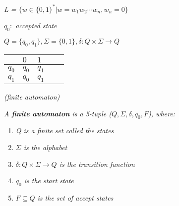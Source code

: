 \documentclass{article}
\begin{document}
\begin{example}
    \textit{L = $\{w\in \{0,1\}^*|w = w_1w_2\cdots w_n,w_n = 0\}$\\}
    \begin{remark}
        \textit{$q_0:$ accepted state}
    \end{remark}
    \textit{$Q = \{q_0,q_1\},\Sigma = \{0,1\},\delta: Q\times \Sigma \rightarrow Q$}
    \begin{table}[htbp]
        \centering
        \begin{tabularx}{\textwidth}{XXXXX}
            \toprule
        $~$ & $0$ & $1$  \\
        \midrule
        $q_0$ & $q_0$ & $q_1$ \\
        $q_1$ & $q_0$ & $q_1$ \\
            \bottomrule
        \end{tabularx}
    \end{table}
\end{example}


\begin{defn}
    \textit{(finite automaton)}

    \textit{A \textbf{finite automaton} is a 5-tuple ($Q,\Sigma,\delta,q_0,F$), where:}

    \begin{enumerate}
        \item \textit{Q is a finite set called the states}
        \item \textit{$\Sigma$ is the alphabet}
        \item \textit{$\delta:Q\times \Sigma \rightarrow Q$ is the transition function}
        \item \textit{$q_0$ is the start state }
        \item \textit{$F\subseteq Q$ is the set of accept states}
    \end{enumerate}
\end{defn}
\end{document}
